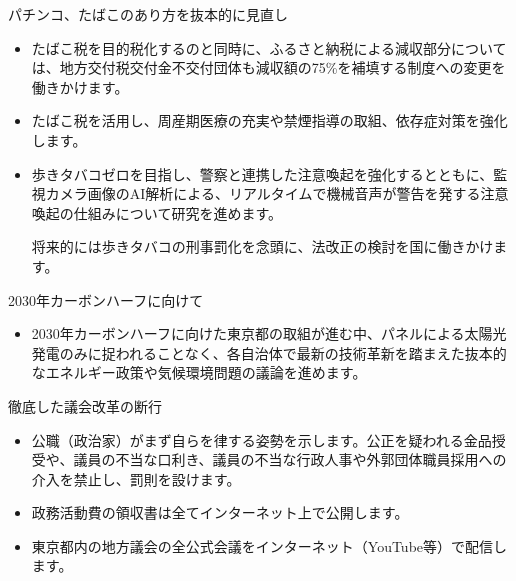 \documentclass[dvipdfmx]{beamer}
\begin{document}
    \begin{frame}{パチンコ、たばこのあり方を抜本的に見直し}{}
        \begin{small}
            \begin{itemize}
                \setlength{\itemsep}{2mm}
                \item たばこ税を目的税化するのと同時に、ふるさと納税による減収部分については、地方交付税交付金不交付団体も減収額の75\%を補填する制度への変更を働きかけます。
                \item たばこ税を活用し、周産期医療の充実や禁煙指導の取組、依存症対策を強化します。
                \item 歩きタバコゼロを目指し、警察と連携した注意喚起を強化するとともに、監視カメラ画像のAI解析による、リアルタイムで機械音声が警告を発する注意喚起の仕組みについて研究を進めます。\par 将来的には歩きタバコの刑事罰化を念頭に、法改正の検討を国に働きかけます。
            \end{itemize}
        \end{small}
    \end{frame}

    \begin{frame}{2030年カーボンハーフに向けて}{}
        \begin{small}
            \begin{itemize}
                \setlength{\itemsep}{2mm}
                \item 2030年カーボンハーフに向けた東京都の取組が進む中、パネルによる太陽光発電のみに捉われることなく、各自治体で最新の技術革新を踏まえた抜本的なエネルギー政策や気候環境問題の議論を進めます。
            \end{itemize}
        \end{small}
    \end{frame}

    \begin{frame}{徹底した議会改革の断行}{}
        \begin{small}
            \begin{itemize}
                \setlength{\itemsep}{2mm}
                \item 公職（政治家）がまず自らを律する姿勢を示します。公正を疑われる金品授受や、議員の不当な口利き、議員の不当な行政人事や外郭団体職員採用への介入を禁止し、罰則を設けます。
                \item 政務活動費の領収書は全てインターネット上で公開します。
                \item 東京都内の地方議会の全公式会議をインターネット（YouTube等）で配信します。
            \end{itemize}
        \end{small}
    \end{frame}
    
\end{document}
